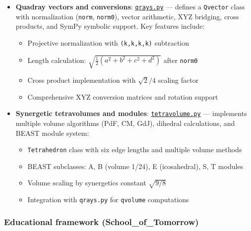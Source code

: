 \documentclass[
  10pt,
]{article}
\providecommand{\tightlist}{%
  \setlength{\itemsep}{0pt}\setlength{\parskip}{0pt}}
\begin{document}
\begin{itemize}
\tightlist
\item
  \textbf{Quadray vectors and conversions}:
  \href{https://github.com/4dsolutions/m4w/blob/main/qrays.py}{\texttt{qrays.py}}
  --- defines a \texttt{Qvector} class with normalization
  (\texttt{norm}, \texttt{norm0}), vector arithmetic, XYZ bridging,
  cross products, and SymPy symbolic support. Key features include:

  \begin{itemize}
  \tightlist
  \item
    Projective normalization with \texttt{(k,k,k,k)} subtraction
  \item
    Length calculation: \(\sqrt{\frac{1}{2}(a^2+b^2+c^2+d^2)}\) after
    \texttt{norm0}
  \item
    Cross product implementation with \(\sqrt{2}/4\) scaling factor
  \item
    Comprehensive XYZ conversion matrices and rotation support
  \end{itemize}
\item
  \textbf{Synergetic tetravolumes and modules}:
  \href{https://github.com/4dsolutions/m4w/blob/main/tetravolume.py}{\texttt{tetravolume.py}}
  --- implements multiple volume algorithms (PdF, CM, GdJ), dihedral
  calculations, and BEAST module system:

  \begin{itemize}
  \tightlist
  \item
    \texttt{Tetrahedron} class with six edge lengths and multiple volume
    methods
  \item
    BEAST subclasses: A, B (volume 1/24), E (icosahedral), S, T modules
  \item
    Volume scaling by synergetics constant \(\sqrt{9/8}\)
  \item
    Integration with \texttt{qrays.py} for \texttt{qvolume} computations
  \end{itemize}
\end{itemize}

\hypertarget{educational-framework-school_of_tomorrow}{%
\subsubsection{Educational framework
(School\_of\_Tomorrow)}\label{educational-framework-school_of_tomorrow}}
\end{document}
